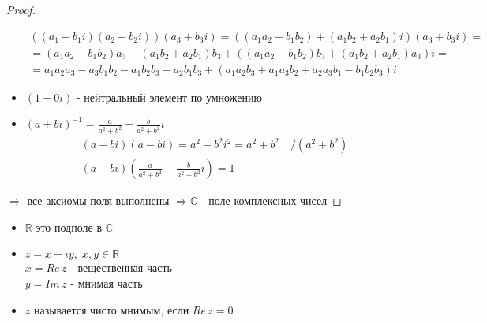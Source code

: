 \begin{proof}
\begin{itemize}
\begin{gather*}
            ((a_1 + b_1i)(a_2 + b_2i))(a_3 + b_3i) = ((a_1a_2 - b_1b_2) + (a_1b_2 + a_2b_1)i)(a_3 + b_3i) = \\
            = (a_1a_2 - b_1b_2)a_3 - (a_1b_2 + a_2b_1)b_3 + ((a_1a_2 - b_1b_2)b_3 + (a_1b_2 + a_2b_1)a_3)i = \\
            = a_1a_2a_3 - a_3b_1b_2 - a_1b_2b_3 - a_2b_1b_3 + (a_1a_2b_3 + a_1a_3b_2 + a_2a_3b_1 - b_1b_2b_3)i
        \end{gather*}
        \item $(1 + 0i)$ - нейтральный элемент по умножению 
        \item $(a + bi)^{-1} = \frac{a}{a^2 + b^2} - \frac{b}{a^2 + b^2}i$
        \begin{gather*}
            (a + bi)(a - bi) = a^2 - b^2i^2 = a^2 + b^2 \quad  /(a^2 + b^2) \\
            (a + bi)(\frac{a}{a^2 + b^2} - \frac{b}{a^2 + b^2}i) = 1
        \end{gather*}
    \end{itemize}
    $\Rightarrow$ все аксиомы поля выполнены $\Rightarrow \mathbb{C}$ - поле комплексных чисел 
\end{proof}
\begin{itemize}
    \item $\mathbb{R}$ это подполе в $\mathbb{C}$ 
    \item $z = x + iy,\; x, y \in \mathbb{R}$ \\
    $x = Re\,z$ - вещественная часть \\
    $y = Im\,z$ - мнимая часть
    \item $z$ называется чисто мнимым, если $Re\,z = 0$
\end{itemize}